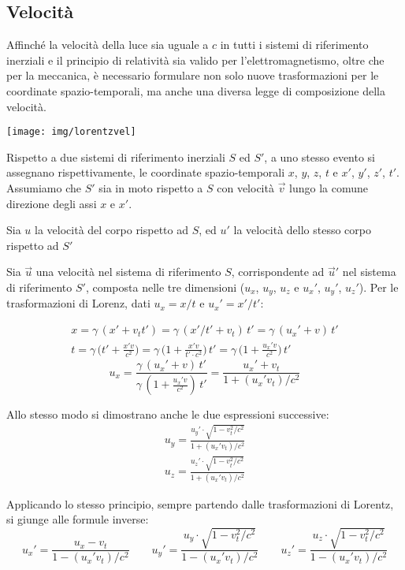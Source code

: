 \documentclass[a4paper, oneside]{article}
\newcounter{i}%
\newcounter{n}%
\begin{document}
\subsection{Velocità}

Affinché la velocità della luce sia uguale a $c$ in tutti i sistemi di riferimento inerziali e il principio di relatività sia valido per l'elettromagnetismo, oltre che per la meccanica, è necessario formulare non solo nuove trasformazioni per le coordinate spazio-temporali, ma anche una diversa legge di composizione della velocità.

\begin{center}
\texttt{[image: img/lorentzvel]}
\end{center}

Rispetto a due sistemi di riferimento inerziali $S$ ed $S'$, a uno stesso evento si assegnano rispettivamente, le coordinate spazio-temporali $x$, $y$, $z$, $t$ e $x'$, $y'$, $z'$, $t'$.
Assumiamo che $S'$ sia in moto rispetto a $S$ con velocità $\vec{v}$ lungo la comune direzione degli assi $x$ e $x'$.

Sia $u$ la velocità del corpo rispetto ad $S$, ed $u'$ la velocità dello stesso corpo rispetto ad $S'$

Sia $\vec{u}$ una velocità nel sistema di riferimento $S$, corrispondente ad $\vec{u}'$ nel sistema di riferimento $S'$, composta nelle tre dimensioni ($u_x$, $u_y$, $u_z$ e $u_x'$, $u_y'$, $u_z'$). Per le trasformazioni di Lorenz, dati $u_x=x/t$ e $u_x'=x'/t'$:

\begin{gather*}
x=\gamma\,(x'+v_tt')=\gamma\,(x'/t'+v_t)\,t'=\gamma\,(u_x'+v)\,t'\\
t=\gamma\,\Big(t'+\frac{x'v}{c^2}\Big)=\gamma\,\Big(1+\frac{x'v}{t'\cdot c^2}\Big)\,t'=\gamma\,\Big(1+\frac{u_x'v}{c^2}\Big)\,t'
\end{gather*}
\[u_x=\frac{\gamma\,(u_x'+v)\,t'}{\gamma\,(1+\frac{u_x'v}{c^2})\,t'}=\frac{u_x'+v_t}{1+(u_x'v_t)/c^2}\]

Allo stesso modo si dimostrano anche le due espressioni successive:
\begin{gather*}
u_y=\frac{u_y'\cdot\sqrt{1-v_t^2/c^2}}{1+(u_x'v_t)/c^2}\\
u_z=\frac{u_z'\cdot\sqrt{1-v_t^2/c^2}}{1+(u_x'v_t)/c^2}
\end{gather*}

Applicando lo stesso principio, sempre partendo dalle trasformazioni di Lorentz, si giunge alle formule inverse:
\[u_x'=\frac{u_x-v_t}{1-(u_x'v_t)/c^2}\qquad u_y'=\frac{u_y\cdot\sqrt{1-v_t^2/c^2}}{1-(u_x'v_t)/c^2}\qquad u_z'=\frac{u_z\cdot\sqrt{1-v_t^2/c^2}}{1-(u_x'v_t)/c^2}\]
\end{document}
